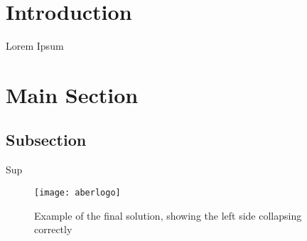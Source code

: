 


\section{Introduction}
Lorem Ipsum

\section{Main Section}
\subsection{Subsection}
Sup \cite{Bob2015} 

\begin{figure}[!htb]
\begin{center}
\texttt{[image: aberlogo]}
\caption{Example of the final solution, showing the left side collapsing correctly}
\end{center}
\end{figure}
\FloatBarrier




